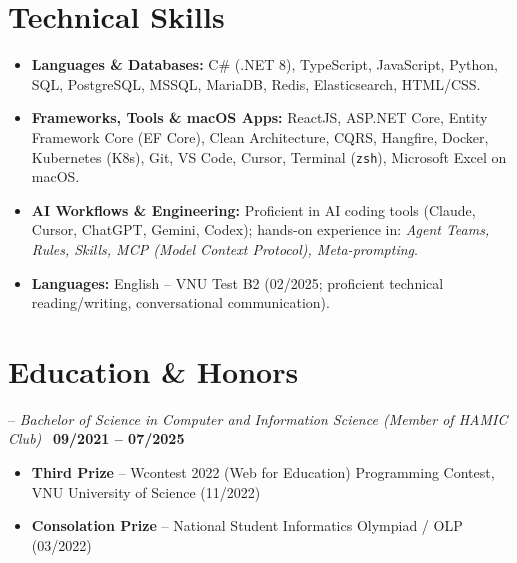 \documentclass[a4paper,10pt]{article}
\begin{document}
\section{Technical Skills}
\begin{itemize}
    \item \textbf{Languages \& Databases:} C\# (.NET 8), TypeScript, JavaScript, Python, SQL, PostgreSQL, MSSQL, MariaDB, Redis, Elasticsearch, HTML/CSS.
    \item \textbf{Frameworks, Tools \& macOS Apps:} ReactJS, ASP.NET Core, Entity Framework Core (EF Core), Clean Architecture, CQRS, Hangfire, Docker, Kubernetes (K8s), Git, VS Code, Cursor, Terminal (\texttt{zsh}), Microsoft Excel on macOS.
    \item \textbf{AI Workflows \& Engineering:} Proficient in AI coding tools (Claude, Cursor, ChatGPT, Gemini, Codex); hands-on experience in: \textit{Agent Teams, Rules, Skills, MCP (Model Context Protocol), Meta-prompting}.
    \item \textbf{Languages:} English -- VNU Test B2 (02/2025; proficient technical reading/writing, conversational communication).
\end{itemize}

\section{Education \& Honors}
 -- \textit{Bachelor of Science in Computer and Information Science (Member of HAMIC Club)} \textbar\ \textbf{09/2021 -- 07/2025}\par\nopagebreak
\begin{itemize}
    \item \textbf{Third Prize} -- Wcontest 2022 (Web for Education) Programming Contest, VNU University of Science (11/2022)
    \item \textbf{Consolation Prize} -- National Student Informatics Olympiad / OLP (03/2022)
\end{itemize}
\end{document}
